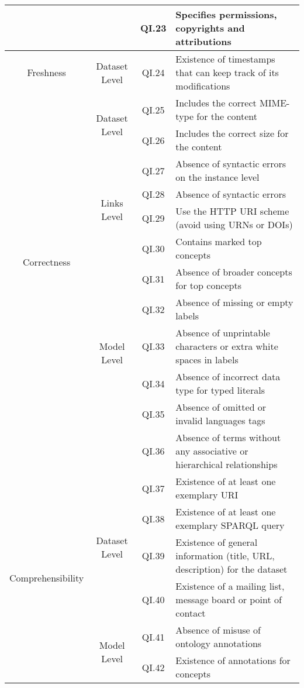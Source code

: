 \documentclass[onecolumn, crcready]{iosart2c}
\begin{document}
\begin{center}
{\begin{longtable}[h]{|c|c|c|l|}
\cline{3-4}
 &  & QI.23 & Specifies permissions, copyrights and attributions  \cite{Framework2012}\tabularnewline
\hline
\hline
\multirow{1}{*}{Freshness} & \multirow{1}{*}{Dataset Level} & QI.24 & Existence of timestamps that can keep track of its modifications  \cite{Flouris2012}\tabularnewline
\hline
\hline
\multirow{11}{*}{Correctness}  & \multirow{2}{*}{Dataset Level} & QI.25 & Includes the correct MIME-type for the content  \cite{Hogan2010}\tabularnewline
\cline{3-4}
 &  & QI.26 & Includes the correct size for the content \tabularnewline
 \cline{3-4}
 &  & QI.27 & Absence of syntactic errors on the instance level \cite{Hogan2010}\tabularnewline
\cline{2-4}
 & \multirow{2}{*}{Links Level} & QI.28 & Absence of syntactic errors  \cite{Suominen2013}\tabularnewline
 \cline{3-4}
 &  & QI.29 & Use the HTTP URI scheme (avoid using URNs or DOIs) \cite{Mader2012}\tabularnewline
\cline{2-4}
 & \multirow{7}{*}{Model Level} & QI.30 & Contains marked top concepts \cite{Mader2012}\tabularnewline
\cline{3-4}
 &  & QI.31 & Absence of broader concepts for top concepts \cite{Mader2012}\tabularnewline
 \cline{3-4}
 & & QI.32 & Absence of missing or empty labels \cite{Acosta2013}\cite{Mader2012}\tabularnewline
  \cline{3-4}
 & & QI.33 & Absence of unprintable characters \cite{Acosta2013}\cite{Mader2012} or extra white spaces in labels \cite{Suominen:2012:IQS:2413941.2413985}\tabularnewline
\cline{3-4}
 &  & QI.34 & Absence of incorrect data type for typed literals \cite{Hogan2010}\cite{Acosta2013} \tabularnewline
\cline{3-4}
 &  & QI.35 & Absence of omitted or invalid languages tags \cite{Suominen:2012:IQS:2413941.2413985}\cite{Mader2012}\tabularnewline
\cline{3-4}
 &  & QI.36 & Absence of terms without any associative or hierarchical relationships \cite{journals/ires/Living10}\tabularnewline
\hline
\hline
\multirow{7}{*}{Comprehensibility} & \multirow{4}{*}{Dataset Level} & QI.37 & Existence of at least one exemplary URI \cite{Framework2012}\tabularnewline
\cline{3-4}
 &  & QI.38 & Existence of at least one exemplary SPARQL query \cite{Framework2012}\tabularnewline
 \cline{3-4}
 &  & QI.39 &  Existence of general information (title, URL, description) for the dataset \tabularnewline
\cline{3-4}
 &  & QI.40 & Existence of a mailing list, message board or point of contact \cite{flemming2010}\tabularnewline
 \cline{2-4}
 & \multirow{3}{*}{Model Level} & QI.41 & Absence of misuse of ontology annotations \cite{Mader2012}\cite{DBLP:conf/ic3k/KeetSP13}\tabularnewline
  \cline{3-4}
 & & QI.42 & Existence of annotations for concepts \cite{DBLP:conf/ic3k/KeetSP13}\tabularnewline

\end{longtable}}
\end{center}
\end{document}
